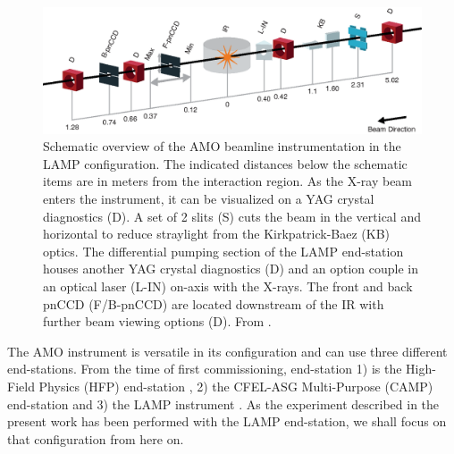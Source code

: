 \begin{figure}
	\centering
		\includegraphics[width=1.00\textwidth]{images/beam_layout.eps}
	\caption[Schematic overview of the AMO beamline instrumentation.]{Schematic overview of the AMO beamline instrumentation in the LAMP configuration. The indicated distances below the schematic items are in meters from the interaction region. As the X-ray beam enters the instrument, it can be visualized on a YAG crystal diagnostics (D). A set of 2 slits (S) cuts the beam in the vertical and horizontal to reduce straylight from the Kirkpatrick-Baez (KB) optics. The differential pumping section of the LAMP end-station houses another YAG crystal diagnostics (D) and an option couple in an optical laser (L-IN) on-axis with the X-rays. The front and back pnCCD (F/B-pnCCD) are located downstream of the IR with further beam viewing options (D). From \citep{Ferguson-2015-JSR}.}
	\label{fig:beam_layout}
\end{figure}
The AMO instrument is versatile in its configuration and can use three different end-stations. From the time of first commissioning, end-station 1) is the High-Field Physics (HFP) end-station \citep{Bozek-2009-EPJST,Bostedt-2013-JPB}, 2) the CFEL-ASG Multi-Purpose (CAMP) end-station \citep{Strueder-2010-NIMPA} and 3) the LAMP instrument \citep{Ferguson-2015-JSR,Bucher-2016-Unpublished}. As the experiment described in the present work has been performed with the LAMP end-station, we shall focus on that configuration from here on.\\
